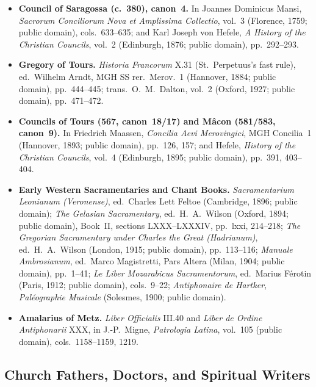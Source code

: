 \begin{itemize}
\item \textbf{Council of Saragossa (c.~380), canon~4.} In Joannes Dominicus Mansi, \textit{Sacrorum Conciliorum Nova et Amplissima Collectio}, vol.~3 (Florence, 1759; public domain), cols.~633--635; and Karl Joseph von Hefele, \textit{A History of the Christian Councils}, vol.~2 (Edinburgh, 1876; public domain), pp.~292--293.
\item \textbf{Gregory of Tours.} \textit{Historia Francorum} X.31 (St.~Perpetuus's fast rule), ed.~Wilhelm Arndt, MGH SS rer.~Merov.~1 (Hannover, 1884; public domain), pp.~444--445; trans.~O.~M.~Dalton, vol.~2 (Oxford, 1927; public domain), pp.~471--472.
\item \textbf{Councils of Tours (567, canon~18/17) and M\^acon (581/583, canon~9).} In Friedrich Maassen, \textit{Concilia Aevi Merovingici}, MGH Concilia~1 (Hannover, 1893; public domain), pp.~126, 157; and Hefele, \textit{History of the Christian Councils}, vol.~4 (Edinburgh, 1895; public domain), pp.~391, 403--404.
\item \textbf{Early Western Sacramentaries and Chant Books.} \textit{Sacramentarium Leonianum (Veronense)}, ed.~Charles Lett Feltoe (Cambridge, 1896; public domain); \textit{The Gelasian Sacramentary}, ed.~H.~A.~Wilson (Oxford, 1894; public domain), Book~II, sections LXXX--LXXXIV, pp.~lxxi, 214--218; \textit{The Gregorian Sacramentary under Charles the Great (Hadrianum)}, ed.~H.~A.~Wilson (London, 1915; public domain), pp.~113--116; \textit{Manuale Ambrosianum}, ed.~Marco Magistretti, Pars Altera (Milan, 1904; public domain), pp.~1--41; \textit{Le Liber Mozarabicus Sacramentorum}, ed.~Marius F\'erotin (Paris, 1912; public domain), cols.~9--22; \textit{Antiphonaire de Hartker}, \textit{Pal\'eographie Musicale} (Solesmes, 1900; public domain).
\item \textbf{Amalarius of Metz.} \textit{Liber Officialis} III.40 and \textit{Liber de Ordine Antiphonarii} XXX, in J.-P.~Migne, \textit{Patrologia Latina}, vol.~105 (public domain), cols.~1158--1159, 1219.
\end{itemize}

\subsection*{Church Fathers, Doctors, and Spiritual Writers}

